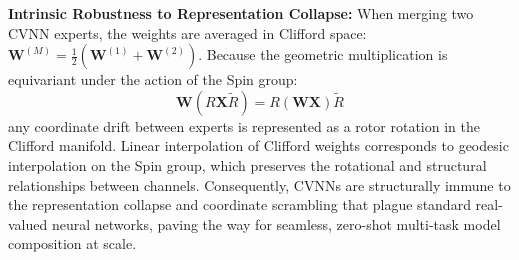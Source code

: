 \documentclass{article}
\begin{document}
\textbf{Intrinsic Robustness to Representation Collapse:}
When merging two CVNN experts, the weights are averaged in Clifford space: $\mathbf{W}^{(M)} = \frac{1}{2}(\mathbf{W}^{(1)} + \mathbf{W}^{(2)})$. Because the geometric multiplication is equivariant under the action of the Spin group:
\begin{equation}
    \mathbf{W} \left( R \mathbf{X} \widetilde{R} \right) = R \left( \mathbf{W} \mathbf{X} \right) \widetilde{R}
\end{equation}
any coordinate drift between experts is represented as a rotor rotation in the Clifford manifold. Linear interpolation of Clifford weights corresponds to geodesic interpolation on the Spin group, which preserves the rotational and structural relationships between channels. Consequently, CVNNs are structurally immune to the representation collapse and coordinate scrambling that plague standard real-valued neural networks, paving the way for seamless, zero-shot multi-task model composition at scale.
\end{document}
